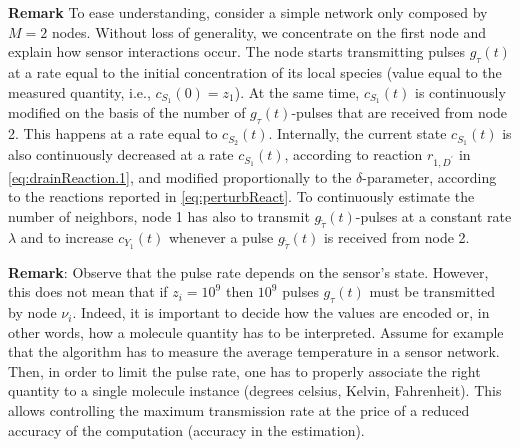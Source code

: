 \documentclass[journal]{IEEEtran}
\begin{document}
{
{\bf{Remark}} To ease understanding, consider a simple network only composed by $M=2$ nodes. Without loss of generality, we concentrate on the first node and explain how sensor interactions occur. The node starts transmitting pulses $g_\tau(t)$ at a rate equal to the initial concentration of its local species (value equal to the measured quantity, i.e., $c_{S_1}(0)=z_1$). At the same time, $c_{S_1}(t)$ is continuously modified on the basis of the number of $g_\tau(t)$-pulses that are received from node 2. This happens at a rate equal to $c_{S_2}(t)$. Internally, the current state $c_{S_1}(t)$ is also continuously decreased at a rate $c_{S_1}(t)$, according to reaction $r_{1,{D^{\prime}}}$ in \eqref{eq:drainReaction.1}, and modified proportionally to the $\delta$-parameter, according to the reactions reported in \eqref{eq:perturbReact}. To continuously estimate the number of neighbors, node 1 has also to transmit $g_{\tilde \tau}(t)$-pulses at a constant rate $\lambda$ and to increase $c_{Y_1}(t)$ whenever a pulse $g_{\tilde \tau}(t)$ is received from node 2. 
}


{{\bf{Remark}}: Observe that the pulse rate depends on the sensor's state. However, this does not mean that if $z_i = 10^9$ then $10^9$ pulses $g_\tau(t)$ must be transmitted by node $\nu_i$. Indeed, it is important to decide how the values are encoded or, in other words, how a molecule quantity has to be interpreted. Assume for example that the algorithm has to measure the average temperature in a sensor network. Then, in order to limit the pulse rate, one has to properly associate the right quantity to a single molecule instance (degrees celsius, Kelvin, Fahrenheit). This allows controlling the maximum transmission rate at the price of a reduced accuracy of the computation
(accuracy in the estimation).}
\end{document}
